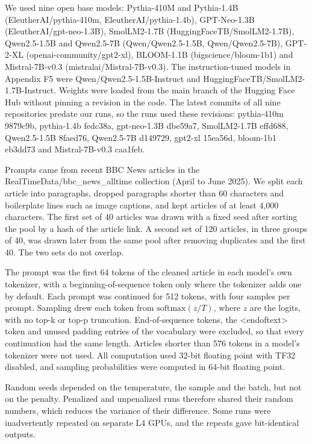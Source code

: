 \documentclass[aps,prx,onecolumn,superscriptaddress,longbibliography]{revtex4-2}
\begin{document}
We used nine open base models: Pythia-410M and Pythia-1.4B (EleutherAI/pythia-410m, EleutherAI/pythia-1.4b), GPT-Neo-1.3B (EleutherAI/gpt-neo-1.3B), SmolLM2-1.7B (HuggingFaceTB/SmolLM2-1.7B), Qwen2.5-1.5B and Qwen2.5-7B (Qwen/Qwen2.5-1.5B, Qwen/Qwen2.5-7B), GPT-2-XL (openai-community/gpt2-xl), BLOOM-1.1B (bigscience/bloom-1b1) and Mistral-7B-v0.3 (mistralai/Mistral-7B-v0.3). The instruction-tuned models in Appendix F5 were Qwen/Qwen2.5-1.5B-Instruct and HuggingFaceTB/SmolLM2-1.7B-Instruct. Weights were loaded from the main branch of the Hugging Face Hub without pinning a revision in the code. The latest commits of all nine repositories predate our runs, so the runs used these revisions: pythia-410m 9879c9b, pythia-1.4b fedc38a, gpt-neo-1.3B dbe59a7, SmolLM2-1.7B effd688, Qwen2.5-1.5B 8faed76, Qwen2.5-7B d149729, gpt2-xl 15ea56d, bloom-1b1 eb3dd73 and Mistral-7B-v0.3 caa1feb.

Prompts came from recent BBC News articles in the RealTimeData/bbc\_news\_alltime collection \cite{LiEtAl2024} (April to June 2025). We split each article into paragraphs, dropped paragraphs shorter than 60 characters and boilerplate lines such as image captions, and kept articles of at least 4,000 characters. The first set of 40 articles was drawn with a fixed seed after sorting the pool by a hash of the article link. A second set of 120 articles, in three groups of 40, was drawn later from the same pool after removing duplicates and the first 40. The two sets do not overlap.

The prompt was the first 64 tokens of the cleaned article in each model's own tokenizer, with a beginning-of-sequence token only where the tokenizer adds one by default. Each prompt was continued for 512 tokens, with four samples per prompt. Sampling drew each token from \(\mathrm{softmax}(z/T)\), where \(z\) are the logits, with no top-k or top-p truncation. End-of-sequence tokens, the \textless\textbar endoftext\textbar\textgreater{} token and unused padding entries of the vocabulary were excluded, so that every continuation had the same length. Articles shorter than 576 tokens in a model's tokenizer were not used. All computation used 32-bit floating point with TF32 disabled, and sampling probabilities were computed in 64-bit floating point.

Random seeds depended on the temperature, the sample and the batch, but not on the penalty. Penalized and unpenalized runs therefore shared their random numbers, which reduces the variance of their difference. Some runs were inadvertently repeated on separate L4 GPUs, and the repeats gave bit-identical outputs.
\end{document}
